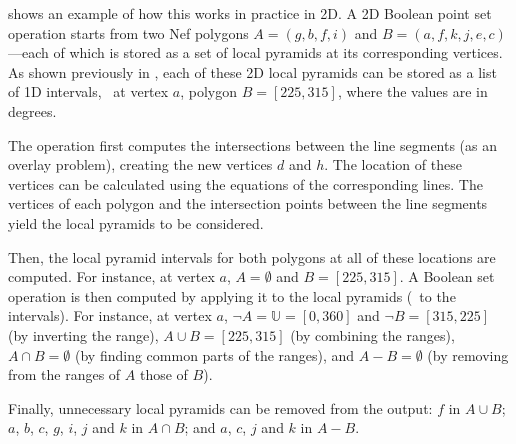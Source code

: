  shows an example of how this works in practice in 2D.
A 2D Boolean point set operation starts from two Nef polygons \(A = (g, b, f, i)\) and \(B = (a, f, k, j, e, c)\)---each of which is stored as a set of local pyramids at its corresponding vertices.
As shown previously in , each of these 2D local pyramids can be stored as a list of 1D intervals, \eg\ at vertex \(a\), polygon \(B = [225, 315]\), where the values are in degrees.

The operation first computes the intersections between the line segments (as an overlay problem), creating the new vertices \(d\) and \(h\).
The location of these vertices can be calculated using the equations of the corresponding lines.
The vertices of each polygon and the intersection points between the line segments yield the local pyramids to be considered.

Then, the local pyramid intervals for both polygons at all of these locations are computed.
For instance, at vertex \(a\), \(A = \emptyset{}\) and \(B = [225, 315]\).
A Boolean set operation is then computed by applying it to the local pyramids (\ie\ to the intervals).
For instance, at vertex \(a\), \(\neg A = \mathbb{U} = [0, 360]\) and \(\neg B = [315, 225]\) (by inverting the range), \(A \cup B = [225, 315]\) (by combining the ranges), \(A \cap B = \emptyset{}\) (by finding common parts of the ranges), and \(A - B = \emptyset{}\) (by removing from the ranges of \(A\) those of \(B\)).

Finally, unnecessary local pyramids can be removed from the output: \(f\) in \(A \cup B\); \(a\), \(b\), \(c\), \(g\), \(i\), \(j\) and \(k\) in \(A \cap B\); and \(a\), \(c\), \(j\) and \(k\) in \(A - B\).

